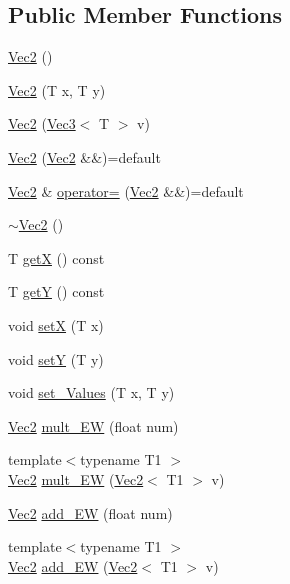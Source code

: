 \subsection*{Public Member Functions}
\begin{DoxyCompactItemize}
\item 
\mbox{\hyperlink{class_vec2_a0d51ef92a3baedc006bca6a702cefc65}{Vec2}} ()
\item 
\mbox{\hyperlink{class_vec2_a43581c2c510e3731cbe9f49a328d73b9}{Vec2}} (T x, T y)
\item 
\mbox{\hyperlink{class_vec2_af8b050d3183cdd021678f51f72462726}{Vec2}} (\mbox{\hyperlink{class_vec3}{Vec3}}$<$ T $>$ v)
\item 
\mbox{\hyperlink{class_vec2_a2269a937aae8731a9f545dcc81290c28}{Vec2}} (\mbox{\hyperlink{class_vec2}{Vec2}} \&\&)=default
\item 
\mbox{\hyperlink{class_vec2}{Vec2}} \& \mbox{\hyperlink{class_vec2_a13ea5fda8289d864dd67d13fcbfc12b7}{operator=}} (\mbox{\hyperlink{class_vec2}{Vec2}} \&\&)=default
\item 
\mbox{\hyperlink{class_vec2_adf180a810cb1233501a9345a4553045f}{$\sim$\+Vec2}} ()
\item 
T \mbox{\hyperlink{class_vec2_ab9c6aa483fc884d65a0f50a6426dce04}{getX}} () const
\item 
T \mbox{\hyperlink{class_vec2_ab34c86af20c627cd5ed0e1a973a43fa3}{getY}} () const
\item 
void \mbox{\hyperlink{class_vec2_aec2b21ff78bf3a2e20a044e1ab7d4b53}{setX}} (T x)
\item 
void \mbox{\hyperlink{class_vec2_afb88a3937a78e4d2d7f9031321e6a20b}{setY}} (T y)
\item 
void \mbox{\hyperlink{class_vec2_a238a918f6d2695dd187a9778982a1769}{set\+\_\+\+Values}} (T x, T y)
\item 
\mbox{\hyperlink{class_vec2}{Vec2}} \mbox{\hyperlink{class_vec2_ac200080cc1d4f4433e5405030c3cae83}{mult\+\_\+\+EW}} (float num)
\item 
{\footnotesize template$<$typename T1 $>$ }\\\mbox{\hyperlink{class_vec2}{Vec2}} \mbox{\hyperlink{class_vec2_ad43121f0be39c026011cd69e8b8128f3}{mult\+\_\+\+EW}} (\mbox{\hyperlink{class_vec2}{Vec2}}$<$ T1 $>$ v)
\item 
\mbox{\hyperlink{class_vec2}{Vec2}} \mbox{\hyperlink{class_vec2_a4a2dba8465365b6f1a385d61f38f5fe0}{add\+\_\+\+EW}} (float num)
\item 
{\footnotesize template$<$typename T1 $>$ }\\\mbox{\hyperlink{class_vec2}{Vec2}} \mbox{\hyperlink{class_vec2_a5cb06b33f0fcdedec1307eed8f406e29}{add\+\_\+\+EW}} (\mbox{\hyperlink{class_vec2}{Vec2}}$<$ T1 $>$ v)

\end{DoxyCompactItemize}
